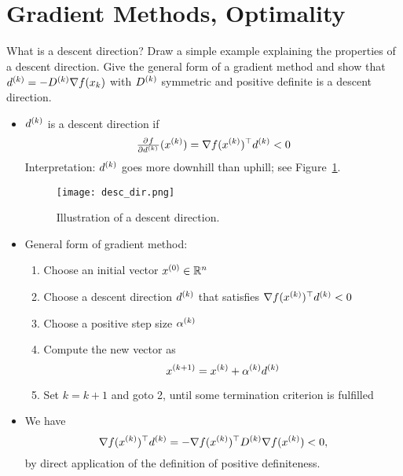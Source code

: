 \documentclass{article}
\begin{document}
\section{Gradient Methods, Optimality}

\begin{question}
  What is a descent direction? Draw a simple example explaining the properties of a descent
  direction. Give the general form of a gradient method and show that
  \(\kth{d} = -\kth{D} \nabla f(x_k)\) with \(\kth{D}\) symmetric and positive definite is a descent
  direction.
\end{question}
\begin{itemize}
\item \(\kth{d}\) is a descent direction if
  \begin{equation*}
    \pd{f}{{\kth{d}}}(\kth{x}) = \T{\nabla f(\kth{x})} \kth{d} < 0
  \end{equation*}
  Interpretation: \(\kth{d}\) goes more downhill than uphill; see Figure~\ref{fig:desc_dir}.
  \begin{figure}[H]
    \centering
    \texttt{[image: desc\_dir.png]}
    \caption{Illustration of a descent direction.\label{fig:desc_dir}}
  \end{figure}
\item General form of gradient method:
  \begin{enumerate}
  \item Choose an initial vector \(\kth[0]{x} \in \RR^n\)
  \item Choose a descent direction \(\kth{d}\) that satisfies \(\T{\nabla f(\kth{x})} \kth{d} < 0\)
  \item Choose a positive step size \(\kth{\alpha}\)
  \item Compute the new vector as
  \begin{equation*}
    \kth[k+1]{x} = \kth{x} + \kth{\alpha} \kth{d}
  \end{equation*}
  \item Set \(k = k + 1\) and goto 2, until some termination criterion is fulfilled
\end{enumerate}
\item We have
  \begin{equation*}
    \T{\nabla f(\kth{x})} \kth{d} = -\T{\nabla f(\kth{x})} \kth{D} \nabla f(\kth{x}) < 0,
  \end{equation*}
  by direct application of the definition of positive definiteness.

\end{itemize}
\end{document}
